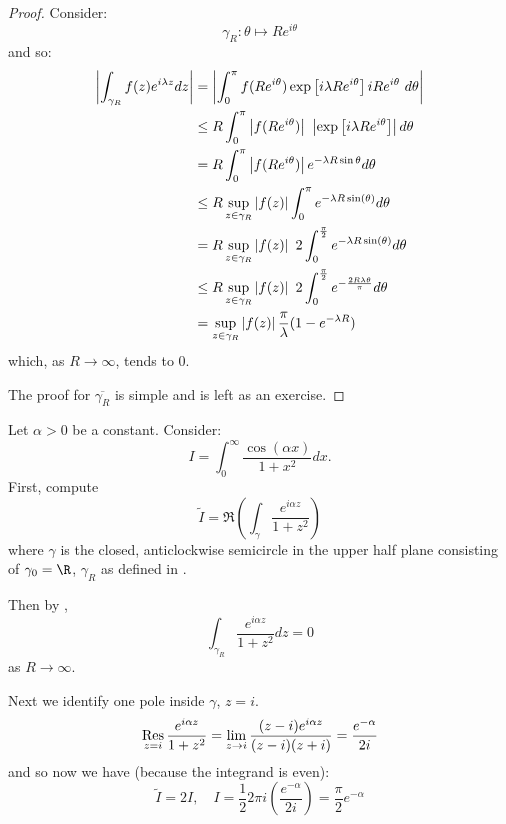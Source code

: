\documentclass[../Main.tex]{subfiles}
\begin{document}
\begin{proof}
    Consider:
    \begin{equation*}
        \gamma_R : \theta \mapsto Re^{i\theta}
    \end{equation*}
    and so:
    \begin{align*}
        \left|\int_{\gamma_R} f(z) e^{i \lambda z} dz \right| &= \left| \int_{0}^{\pi} f(Re^{i\theta}) \exp\left[i \lambda Re^{i\theta}\right] i R e^{i\theta}~d\theta \right| \\
        &\leq R \int_0^\pi \left|f(Re^{i\theta})\right|~\left|\exp\left[i\lambda Re^{i\theta}\right]\right| d\theta \\
        &= R\int_0^\pi \left|f(Re^{i\theta})\right| e^{-\lambda R \sin{\theta}} d\theta \\
        &\leq R \sup_{z \in \gamma_R} \left|f(z)\right| \int_0^\pi e^{-\lambda R \sin(\theta)} d\theta \\
        &= R \sup_{z \in \gamma_R} \left|f(z)\right|~2\int_0^{\frac\pi2} e^{-\lambda R \sin(\theta)} d\theta \\
        &\leq R \sup_{z \in \gamma_R} \left|f(z)\right|~2\int_0^{\frac\pi2} e^{-\frac{2R\lambda\theta}{\pi}} d\theta \\
        &= \sup_{z \in \gamma_R} \left|f(z)\right| \frac{\pi}{\lambda} (1 - e^{-\lambda R})
    \end{align*}
    which, as $R \to \infty$, tends to $0$.

    The proof for $\overline{\gamma_R}$ is simple and is left as an exercise.
\end{proof}
\begin{example}
    Let $\alpha > 0$ be a constant. Consider:
    \begin{equation*}
        I = \int_{0}^{\infty} \frac{\cos(\alpha x)}{1 + x^2} dx.
    \end{equation*}
    First, compute
    \begin{equation*}
        \tilde{I} = \Re\left(\int_\gamma \frac{e^{i\alpha z}}{1 + z^2}\right)
    \end{equation*}
    where $\gamma$ is the closed, anticlockwise semicircle in the upper half plane consisting of $\gamma_0 = \R$, $\gamma_R$ as defined in .

    Then by ,
    \begin{equation*}
        \int_{\gamma_R} \frac{e^{i \alpha z}}{1 + z^2} dz = 0
    \end{equation*}
    as $R \to \infty$.

    Next we identify one pole inside $\gamma$, $z = i$.
    \begin{equation*}
        \operatorname*{Res}_{z = i} \frac{e^{i \alpha z}}{1 + z^2} = \lim_{z \to i} \frac{(z - i) e^{i \alpha z}}{(z - i)(z + i)} = \frac{e^{-\alpha}}{2i}
    \end{equation*}
    and so now we have (because the integrand is even):
    \begin{equation*}
        \tilde{I} = 2I, \quad I = \frac12 2\pi i \left(\frac{e^{-\alpha}}{2i}\right) = \frac{\pi}{2} e^{-\alpha}
    \end{equation*}
\end{example}
\end{document}
